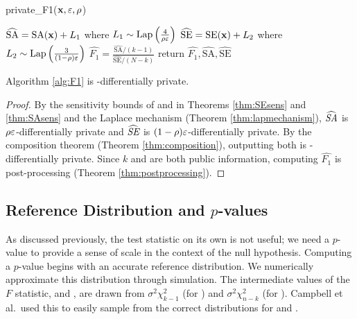 \begin{algorithm}
    \caption{private\_F1($\mathbf{x},\varepsilon, \rho$) \label{alg:F1}}
    \begin{algorithmic}
        \STATE $\widehat{\text{SA}} = \text{SA}(\mathbf{x}) + L_1$ where $L_1\sim\text{Lap}\left(\frac{4}{\rho\varepsilon}\right)$ 
        \STATE $\widehat{\text{SE}} = \text{SE}(\mathbf{x}) + L_2$ where $L_2\sim\text{Lap}\left(\frac{3}{(1-\rho)\varepsilon}\right)$
        \STATE  $\widehat{F_1} = \frac{\widehat{\text{SA}}/(k-1)}{\widehat{\text{SE}}/(N-k)}$
        \STATE return $\widehat{F_1}, \widehat{\text{SA}}, \widehat{\text{SE}}$
    \end{algorithmic}
\end{algorithm}

\begin{theorem} \label{thm:AlgPriv}
Algorithm \ref{alg:F1} is \eps-differentially private.
\end{theorem}
\begin{proof}
By the sensitivity bounds of \se and \sa in Theorems \ref{thm:SEsens} and \ref{thm:SAsens}  and the Laplace mechanism (Theorem \ref{thm:lapmechanism}), $\widehat{\textit{SA}}$ is $\rho\varepsilon$-differentially private and $\widehat{\textit{SE}}$ is $(1-\rho)\varepsilon$-differentially private. By the composition theorem (Theorem \ref{thm:composition}), outputting both is \eps-differentially private. Since $k$ and \dbsize are both public information, computing $\widehat{F_1}$ is post-processing (Theorem \ref{thm:postprocessing}).
\end{proof}


\subsection{Reference Distribution and $p$-values}
\label{subsec:alg-method}


As discussed previously, the test statistic on its own is not useful; we need a $p$-value to provide a sense of scale in the context of the null hypothesis. Computing a $p$-value begins with an accurate reference distribution.  We numerically approximate this distribution through simulation.  The intermediate values of the $F$ statistic, \ssa and \sse, are drawn from  $\sigma^2\chi_{k-1}^2$ (for \ssa) and $\sigma^2\chi_{n-k}^2$ (for \sse).  Campbell et al.~used this to easily sample from the correct distributions for \ssa and \sse.

